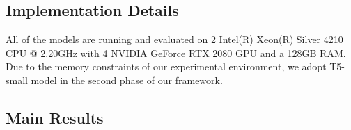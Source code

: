 \subsection{Implementation Details}

All of the models are running and evaluated on 2 Intel(R) Xeon(R) Silver 4210 CPU @ 2.20GHz with 4 NVIDIA GeForce RTX 2080 GPU and a 128GB RAM. Due to the memory constraints of our experimental environment,
we adopt T5-small model in the second phase of our framework.

\subsection{Main Results}
\label{sec:main-results}

\begin{table}[ht!]
\setlength\tabcolsep{3pt}
\centering
\scriptsize
\caption{Results on CANARD. ``Ours-sup'' (Our-supervised) is our framework. ``Ours-rule'' is our framework with unsupervised method introduced in . ``Ours-gold'' is the result of directly inputting the sentence with the correct blanks into the T5-model in phase 2. ``\textbf{F}'' refers to Rewriting F-score. ``\textbf{B}'' refers to BLEU score. ``\textbf{R}'' refers to ROUGE score.}
\label{tab:canard-result}
\end{table}

